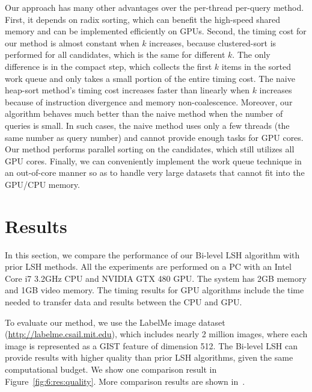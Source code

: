 Our approach has many other advantages over the per-thread per-query method. First, it depends on radix sorting, which can benefit the high-speed shared memory and can be implemented efficiently on GPUs.
Second, the timing cost for our method is almost constant when $k$ increases, because clustered-sort is performed for all candidates, which is the same for different $k$. The only difference is in the compact step, which collects the first $k$ items in the sorted work queue and only takes a small portion of the entire timing cost. The naive heap-sort method's timing cost increases faster than linearly when $k$ increases because of instruction divergence and memory non-coalescence. Moreover, our algorithm behaves much better than the naive method when the number of queries is small. In such cases, the naive method uses only a few threads (the same number as query number) and cannot provide enough tasks for GPU cores. Our method performs parallel sorting on the candidates, which still utilizes all GPU cores. Finally, we can conveniently implement the work queue technique in an out-of-core manner so as to handle very large datasets that cannot fit into the GPU/CPU memory.


\section{Results}
\label{sec:6:res}
In this section, we compare the performance of our Bi-level LSH algorithm with prior LSH methods. All the experiments are performed on a PC with an Intel Core i7 3.2GHz CPU and NVIDIA GTX 480 GPU. The system has 2GB memory and 1GB video memory. The timing results for GPU algorithms include the time needed to transfer data and results between the CPU and GPU.

To evaluate our method, we use the LabelMe image dataset (\url{http://labelme.csail.mit.edu}), which includes nearly 2 million images, where each image is represented as a GIST feature of dimension 512. The Bi-level LSH can provide results with higher quality than prior LSH algorithms, given the same computational budget. We show one comparison result in Figure~\ref{fig:6:res:quality}. More comparison results are shown in~\cite{BilevelLSH2011}.

